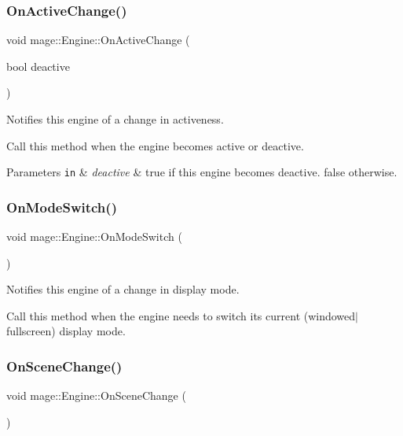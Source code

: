 \subsubsection{\texorpdfstring{On\+Active\+Change()}{OnActiveChange()}}
{\footnotesize\ttfamily void mage\+::\+Engine\+::\+On\+Active\+Change (\begin{DoxyParamCaption}\item[{bool}]{deactive }\end{DoxyParamCaption})\hspace{0.3cm}{\ttfamily [noexcept]}}

Notifies this engine of a change in activeness.

Call this method when the engine becomes active or deactive.


\begin{DoxyParams}[1]{Parameters}
\mbox{\tt in}  & {\em deactive} & {\ttfamily true} if this engine becomes deactive. {\ttfamily false} otherwise. \\
\hline
\end{DoxyParams}
\hypertarget{classmage_1_1_engine_a6ac289fd093967c370955810e26d251f}{}\label{classmage_1_1_engine_a6ac289fd093967c370955810e26d251f} 
\subsubsection{\texorpdfstring{On\+Mode\+Switch()}{OnModeSwitch()}}
{\footnotesize\ttfamily void mage\+::\+Engine\+::\+On\+Mode\+Switch (\begin{DoxyParamCaption}{ }\end{DoxyParamCaption})\hspace{0.3cm}{\ttfamily [noexcept]}}

Notifies this engine of a change in display mode.

Call this method when the engine needs to switch its current (windowed$\vert$fullscreen) display mode. \hypertarget{classmage_1_1_engine_a4bcc8811433865c349c8cc862d4f457d}{}\label{classmage_1_1_engine_a4bcc8811433865c349c8cc862d4f457d} 
\subsubsection{\texorpdfstring{On\+Scene\+Change()}{OnSceneChange()}}
{\footnotesize\ttfamily void mage\+::\+Engine\+::\+On\+Scene\+Change (\begin{DoxyParamCaption}{ }\end{DoxyParamCaption})\hspace{0.3cm}{\ttfamily [noexcept]}}

